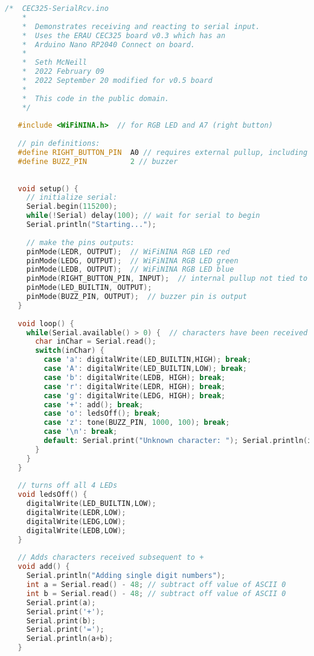 \begin{lstlisting}[language=C++, caption={This sketch shows controlling parts of the 
    board using input from the serial port. Remember, don't copy and paste from a PDF
    since that process garbles some of the characters.},label={lst:serialreceiveexample}]
    /*  CEC325-SerialRcv.ino
    *  
    *  Demonstrates receiving and reacting to serial input.
    *  Uses the ERAU CEC325 board v0.3 which has an 
    *  Arduino Nano RP2040 Connect on board.
    *  
    *  Seth McNeill
    *  2022 February 09
    *  2022 September 20 modified for v0.5 board
    *  
    *  This code in the public domain.
    */
   
   #include <WiFiNINA.h>  // for RGB LED and A7 (right button)
   
   // pin definitions:
   #define RIGHT_BUTTON_PIN  A0 // requires external pullup, including WiFiNINA.h and #define
   #define BUZZ_PIN          2 // buzzer
   
   
   void setup() {
     // initialize serial:
     Serial.begin(115200);
     while(!Serial) delay(100); // wait for serial to begin
     Serial.println("Starting...");
     
     // make the pins outputs:
     pinMode(LEDR, OUTPUT);  // WiFiNINA RGB LED red
     pinMode(LEDG, OUTPUT);  // WiFiNINA RGB LED green
     pinMode(LEDB, OUTPUT);  // WiFiNINA RGB LED blue
     pinMode(RIGHT_BUTTON_PIN, INPUT);  // internal pullup not tied to IDE
     pinMode(LED_BUILTIN, OUTPUT);
     pinMode(BUZZ_PIN, OUTPUT);  // buzzer pin is output
   }
   
   void loop() {
     while(Serial.available() > 0) {  // characters have been received
       char inChar = Serial.read();
       switch(inChar) {
         case 'a': digitalWrite(LED_BUILTIN,HIGH); break;
         case 'A': digitalWrite(LED_BUILTIN,LOW); break;
         case 'b': digitalWrite(LEDB, HIGH); break;
         case 'r': digitalWrite(LEDR, HIGH); break;
         case 'g': digitalWrite(LEDG, HIGH); break;
         case '+': add(); break;
         case 'o': ledsOff(); break;
         case 'z': tone(BUZZ_PIN, 1000, 100); break;
         case '\n': break;
         default: Serial.print("Unknown character: "); Serial.println(inChar);
       }
     }
   }
   
   // turns off all 4 LEDs
   void ledsOff() {
     digitalWrite(LED_BUILTIN,LOW);
     digitalWrite(LEDR,LOW);
     digitalWrite(LEDG,LOW);
     digitalWrite(LEDB,LOW);
   }
   
   // Adds characters received subsequent to +
   void add() {
     Serial.println("Adding single digit numbers");
     int a = Serial.read() - 48; // subtract off value of ASCII 0
     int b = Serial.read() - 48; // subtract off value of ASCII 0
     Serial.print(a);
     Serial.print('+');
     Serial.print(b);
     Serial.print('=');
     Serial.println(a+b);
   }   
\end{lstlisting}



